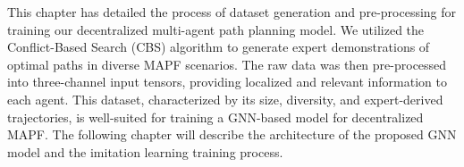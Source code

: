 This chapter has detailed the process of dataset generation and pre-processing for training our decentralized multi-agent path planning model. We utilized the Conflict-Based Search (CBS) algorithm to generate expert demonstrations of optimal paths in diverse MAPF scenarios. The raw data was then pre-processed into three-channel input tensors, providing localized and relevant information to each agent. This dataset, characterized by its size, diversity, and expert-derived trajectories, is well-suited for training a GNN-based model for decentralized MAPF. The following chapter will describe the architecture of the proposed GNN model and the imitation learning training process.